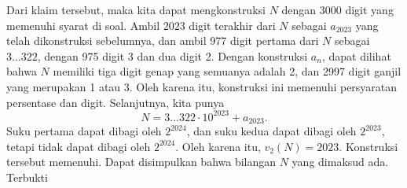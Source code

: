 \begin{solusi}
    Dari klaim tersebut, maka kita dapat mengkonstruksi $N$ dengan $3000$ digit yang memenuhi syarat di soal. Ambil $2023$ digit terakhir dari $N$ sebagai $a_{2023}$ yang telah dikonstruksi sebelumnya, dan ambil 977 digit pertama dari $N$ sebagai $3 \ldots 322$, dengan 975 digit 3 dan dua digit 2. Dengan konstruksi $a_n$, dapat dilihat bahwa $N$ memiliki tiga digit genap yang semuanya adalah 2, dan 2997 digit ganjil yang merupakan 1 atau 3. Oleh karena itu, konstruksi ini memenuhi persyaratan persentase dan digit. 
    Selanjutnya, kita punya
    \[ N = 3\ldots 322 \cdot 10^{2023} + a_{2023}. \]
    Suku pertama dapat dibagi oleh $2^{2024}$, dan suku kedua dapat dibagi oleh $2^{2023}$, tetapi tidak dapat dibagi oleh $2^{2024}$. Oleh karena itu, $v_2(N)=2023$. Konstruksi tersebut memenuhi. Dapat disimpulkan bahwa bilangan $N$ yang dimaksud ada. Terbukti
\end{solusi}